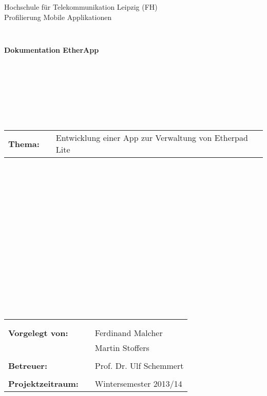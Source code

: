 \thispagestyle{empty}
\begin{center}
\Large{Hochschule für Telekommunikation Leipzig (FH)}\\

\Large{Profilierung Mobile Applikationen}\\
\end{center}
\begin{verbatim}


\end{verbatim}
\begin{center}
\textbf{\Huge{Dokumentation EtherApp}}
\end{center}
\begin{verbatim}








\end{verbatim}
\begin{flushleft}
\begin{tabular}{llp{12cm}}
\textbf{Thema:} & & \LARGE{Entwicklung einer App zur Verwaltung von Etherpad Lite}\\
\end{tabular}
\end{flushleft}
\begin{verbatim}


















\end{verbatim}
\begin{flushleft}
\begin{tabular}{lll}
& & \\
& & \\
\textbf{Vorgelegt von:} & & Ferdinand Malcher \\
                        & & Martin Stoffers \\
& & \\
\textbf{Betreuer:} & & Prof. Dr. Ulf Schemmert\\
& & \\
\textbf{Projektzeitraum:} & & Wintersemester 2013/14
\end{tabular}
\end{flushleft}
